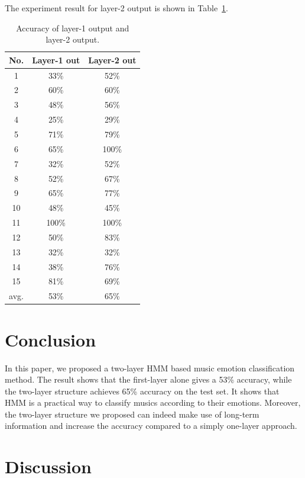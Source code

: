 \documentclass{IEEEtran}
\begin{document}
  The experiment result for layer-2 output is shown in
  Table~\ref{tab:accuracy}.

  \begin{table}
    \caption{Accuracy of layer-1 output and layer-2 output.}
    \label{tab:accuracy}
    \centering
    \begin{tabular}{c|cc}
      No. & Layer-1 out & Layer-2 out \\
      \hline
      1   &  33\%   &  52\% \\
      2   &  60\%   &  60\% \\
      3   &  48\%   &  56\% \\
      4   &  25\%   &  29\% \\
      5   &  71\%   &  79\% \\
      6   &  65\%   & 100\% \\
      7   &  32\%   &  52\% \\
      8   &  52\%   &  67\% \\
      9   &  65\%   &  77\% \\
      10  &  48\%   &  45\% \\
      11  & 100\%   & 100\% \\
      12  &  50\%   &  83\% \\
      13  &  32\%   &  32\% \\
      14  &  38\%   &  76\% \\
      15  &  81\%   &  69\% \\
      \hline
      avg. & 53\%  & 65\% \\
    \end{tabular}
  \end{table}

  \section{Conclusion}
  \label{sec:Conclusion}

  In this paper, we proposed a two-layer HMM based music emotion classification
  method. The result shows that the first-layer alone gives a 53\% accuracy,
  while the two-layer structure achieves 65\% accuracy on the test set. It
  shows that HMM is a practical way to classify musics according to their
  emotions. Moreover, the two-layer structure we proposed can indeed make use
  of long-term information and increase the accuracy compared to a simply
  one-layer approach.

  \section{Discussion}
  \label{sec:Discussion}
\end{document}
